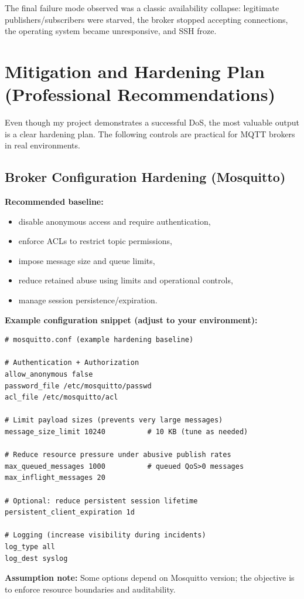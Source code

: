 \documentclass[11pt]{article}
\begin{document}
The final failure mode observed was a classic availability collapse: legitimate publishers/subscribers were starved, the broker stopped accepting connections, the operating system became unresponsive, and SSH froze.

\section{Mitigation and Hardening Plan (Professional Recommendations)}
Even though my project demonstrates a successful DoS, the most valuable output is a clear hardening plan. The following controls are practical for MQTT brokers in real environments.

\subsection{Broker Configuration Hardening (Mosquitto)}
\textbf{Recommended baseline:}
\begin{itemize}
  \item disable anonymous access and require authentication,
  \item enforce ACLs to restrict topic permissions,
  \item impose message size and queue limits,
  \item reduce retained abuse using limits and operational controls,
  \item manage session persistence/expiration.
\end{itemize}

\textbf{Example configuration snippet (adjust to your environment):}
\begin{lstlisting}[style=cmd]
# mosquitto.conf (example hardening baseline)

# Authentication + Authorization
allow_anonymous false
password_file /etc/mosquitto/passwd
acl_file /etc/mosquitto/acl

# Limit payload sizes (prevents very large messages)
message_size_limit 10240          # 10 KB (tune as needed)

# Reduce resource pressure under abusive publish rates
max_queued_messages 1000          # queued QoS>0 messages
max_inflight_messages 20

# Optional: reduce persistent session lifetime
persistent_client_expiration 1d

# Logging (increase visibility during incidents)
log_type all
log_dest syslog
\end{lstlisting}

\textbf{Assumption note:} Some options depend on Mosquitto version; the objective is to enforce resource boundaries and auditability.
\end{document}
